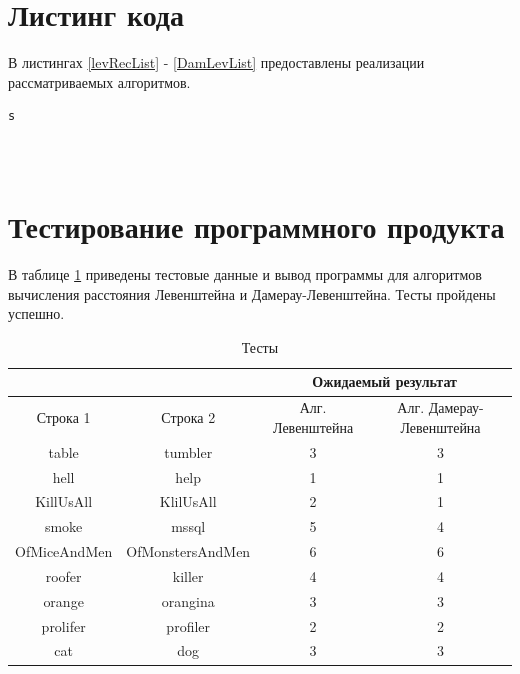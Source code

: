 \documentclass[12pt]{report}
\begin{document}
\section{Листинг кода}
В листингах \ref{levRecList} - \ref{DamLevList} предоставлены реализации рассматриваемых алгоритмов.
\begin{lstlisting}[caption=Функция реализации рекурсивного алгоритма Левенштейна,
label={levRecList}]
s
\end{lstlisting}

\begin{lstlisting}[caption=Функция реализации рекурсивного алгоритма Левенштейна с использованием матрицы расстояний,
label={levRecMatList}]

\end{lstlisting}

\begin{lstlisting}[caption=Функция реализации итеративного алгоритма Левенштейна,
label={levIterList}]

\end{lstlisting}

\begin{lstlisting}[caption=Функция реализации алгоритма Дамерау-Левенштейна,
label={DamLevList}]

\end{lstlisting}

\section{Тестирование программного продукта}
В таблице \ref{table} приведены тестовые данные и вывод программы для алгоритмов вычисления расстояния Левенштейна и Дамерау-Левенштейна. Тесты пройдены успешно.

\newpage
\begin{table}[h]
	\begin{center}
		\caption{\label{table} Тесты}
		\begin{tabular}{|c|c|c|c|}
	\hline
			                    &                    & \multicolumn{2}{c|}{\bfseries Ожидаемый результат}    \\ \cline{3-4}\hline
	Строка 1& Строка 2 & Алг. Левенштейна & Алг. Дамерау-Левенштейна \\ [0.5ex] 
 	\hline\hline
 	table & tumbler & 3 & 3\\
 	\hline
 	hell & help & 1 & 1\\
 	\hline
	KillUsAll & KlilUsAll & 2 & 1\\
	\hline
	smoke & mssql & 5 & 4\\
	\hline
	OfMiceAndMen & OfMonstersAndMen & 6 & 6\\
	\hline
	roofer & killer & 4 & 4\\
	\hline
	orange & orangina & 3 & 3\\
	\hline
	prolifer & profiler & 2 & 2\\
	\hline
	cat & dog & 3 & 3\\
	\hline
		\end{tabular}
	\end{center}
\end{table}
\end{document}
